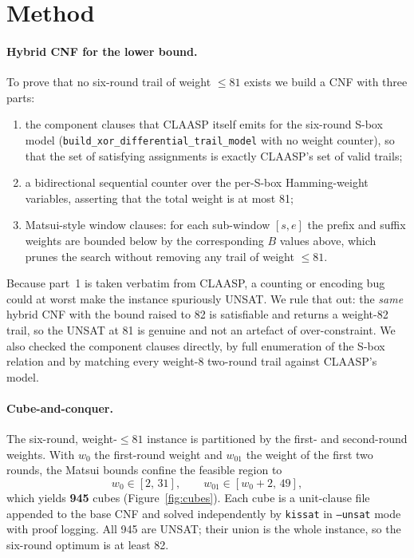 \documentclass[11pt]{article}
\begin{document}
\section{Method}
\label{sec:method}

\paragraph{Hybrid CNF for the lower bound.} To prove that no six-round trail of weight $\le 81$ exists we build a CNF with three parts:
\begin{enumerate}
  \item the component clauses that CLAASP itself emits for the six-round S-box model (\texttt{build\_\allowbreak xor\_\allowbreak differential\_\allowbreak trail\_\allowbreak model} with no weight counter), so that the set of satisfying assignments is exactly CLAASP's set of valid trails;
  \item a bidirectional sequential counter over the per-S-box Hamming-weight variables, asserting that the total weight is at most 81;
  \item Matsui-style window clauses: for each sub-window $[s,e]$ the prefix and suffix weights are bounded below by the corresponding $B$ values above, which prunes the search without removing any trail of weight $\le 81$.
\end{enumerate}
Because part~1 is taken verbatim from CLAASP, a counting or encoding bug could at worst make the instance spuriously UNSAT. We rule that out: the \emph{same} hybrid CNF with the bound raised to 82 is satisfiable and returns a weight-82 trail, so the UNSAT at 81 is genuine and not an artefact of over-constraint. We also checked the component clauses directly, by full enumeration of the S-box relation and by matching every weight-8 two-round trail against CLAASP's model.

\paragraph{Cube-and-conquer.} The six-round, weight-$\le 81$ instance is partitioned by the first- and second-round weights. With $w_0$ the first-round weight and $w_{01}$ the weight of the first two rounds, the Matsui bounds confine the feasible region to
\[
w_0 \in [2,\,31], \qquad w_{01}\in[w_0+2,\,49],
\]
which yields \textbf{945} cubes (Figure~\ref{fig:cubes}). Each cube is a unit-clause file appended to the base CNF and solved independently by \texttt{kissat} in \texttt{--unsat} mode with proof logging. All 945 are UNSAT; their union is the whole instance, so the six-round optimum is at least 82.
\end{document}
